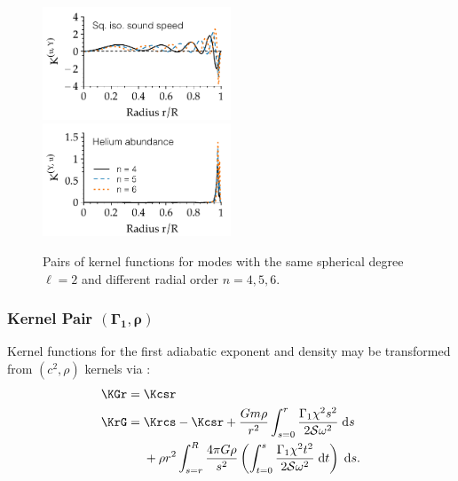 \begin{figure}
    \includegraphics[width=0.5\textwidth]{figs/pulse/kernels/kernel-n-u_Y-diffusion.pdf}%
    \includegraphics[width=0.5\textwidth]{figs/pulse/kernels/kernel-n-Y_u-diffusion.pdf}
    \caption[Kernel functions (same $\ell$, different $n$)]{Pairs of kernel functions for modes with the same spherical degree ${\ell=2}$ and different radial order ${n=4},5,6$. \label{fig:same-ell}}
\end{figure}%

\subsubsection*{Kernel Pair \texorpdfstring{$\mathbf{(\Gamma_1, \rho)}$}{(Gamma1,rho)}}
\noindent
Kernel functions for the first adiabatic exponent and density may be transformed from ${(c^2, \rho)}$ kernels via \citep[e.g.][Equations~104-105]{InversionKit}:
\begin{align}
    \KGr ={} & \Kcsr
\\  \KrG ={} & \Krcs - \Kcsr + \frac{G m \rho}{r^2} \int_{s=0}^r \frac{\Gamma_1 \chi^2 s^2}{2 \mathcal{S} \omega^2} \; \text{d}s
\\\notag   &+ \rho r^2 \int_{s=r}^R \frac{4\pi G \rho}{s^2} \left( \int_{t=0}^s \frac{\Gamma_1 \chi^2 t^2}{2 \mathcal{S} \omega^2} \; \text{d}t \right) \; \text{d}s.
\end{align}

